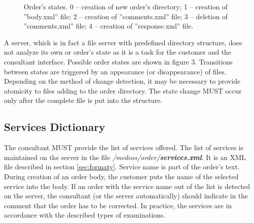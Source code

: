 \documentclass[a4paper]{article}
\begin{document}
\begin{figure}
\centering
{}
\caption[Order's states]{Order's states. 0 -- creation of new order's directory; 1 --
creation of ''body.xml'' file; 2 -- creation of ''comments.xml'' file; 3 -- deletion of 
''comments.xml'' file; 4 -- creation of ''response.xml'' file.}
\label{fig:stany_zlec}
\end{figure}

A server, which is in fact a file server with predefined directory structure, does not 
analyze its own or order's state as it is a task for the customer and the consultant interface.
Possible order states are shown in figure 3. Transitions between states are triggered by 
an appearance (or disappearance) of files. Depending on the method of change detection, 
it may be necessary to provide atomicity to files adding to the order directory. The state 
change MUST occur only after the complete file is put into the structure.

\subsection{Services Dictionary}

The consultant MUST provide the list of services offered. The list of services is 
maintained on the server in the file \textit{/medeos/order/\textbf{services.xml}}. It is an 
XML file described in section \ref{sec:formaty}. Service name is part of the order's text.
During creation of an order body, the customer puts the name of the selected service into 
the body. If an order with the service name out of the list is detected on the server, the 
consultant (or the server automatically) should indicate in the comment that the order has 
to be corrected. In practice, the services are in accordance with the described types of 
examinations.
\end{document}
